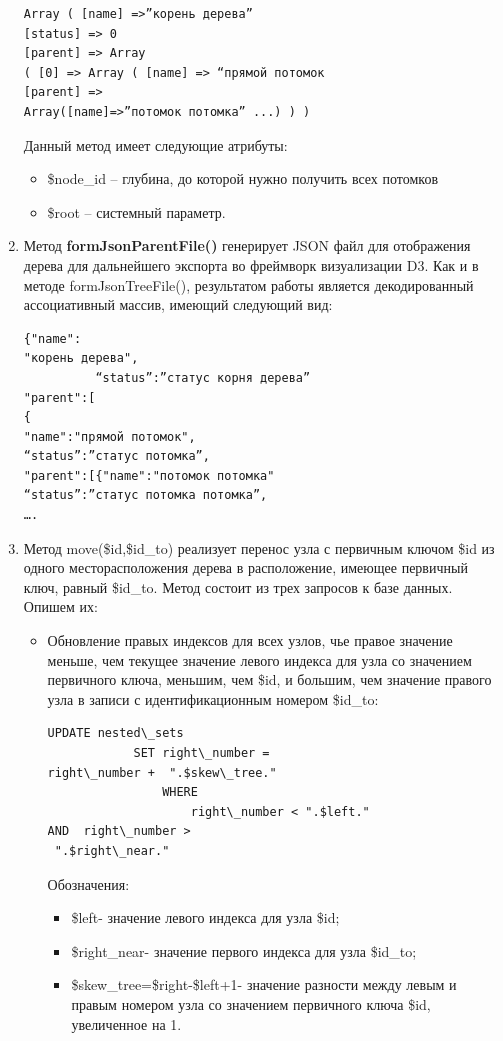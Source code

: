 \documentclass[a4paper,14pt]{extreport}
\theoremstyle{definition}
\begin{document}
\begin{enumerate}
\begin{verbatim}Array ( [name] =>”корень дерева”
[status] => 0
[parent] => Array
( [0] => Array ( [name] => “прямой потомок
[parent] =>
Array([name]=>”потомок потомка” ...) ) )\end{verbatim}
Данный метод имеет следующие атрибуты:
\begin{itemize}
\item \$node\_id – глубина, до которой нужно получить всех потомков
\item \$root – системный параметр.
\end{itemize}
\item Метод \textbf{formJsonParentFile()} генерирует JSON файл для отображения дерева для дальнейшего экспорта во фреймворк визуализации D3. Как и в методе formJsonTreeFile(), результатом работы является декодированный ассоциативный массив, имеющий следующий вид:
\begin{verbatim}{"name":
"корень дерева",
          “status”:”статус корня дерева”
"parent":[
{
"name":"прямой потомок",
“status”:”статус потомка”,
"parent":[{"name":"потомок потомка"
“status”:”статус потомка потомка”,
….\end{verbatim}
\item Метод move(\$id,\$id\_to) реализует перенос узла с первичным ключом \$id из одного месторасположения дерева в расположение, имеющее первичный ключ, равный \$id\_to. Метод состоит из трех запросов к базе данных. Опишем их:
\begin{itemize}
\item Обновление правых индексов для всех узлов, чье правое значение меньше, чем текущее значение левого индекса для узла со значением первичного ключа, меньшим, чем \$id, и большим, чем значение правого узла в записи с идентификационным номером \$id\_to:
\begin{verbatim}UPDATE nested\_sets
			SET right\_number =
right\_number +  ".$skew\_tree."
				WHERE
					right\_number < ".$left."
AND  right\_number >
 ".$right\_near."\end{verbatim}
Обозначения:
\begin{itemize}
\item \$left- значение левого индекса для узла \$id;
\item \$right\_near- значение первого индекса для узла \$id\_to;
\item \$skew\_tree=\$right-\$left+1- значение разности между левым и правым номером узла со значением первичного ключа \$id, увеличенное на 1.
\end{itemize}

\end{itemize}
\end{enumerate}
\end{document}
